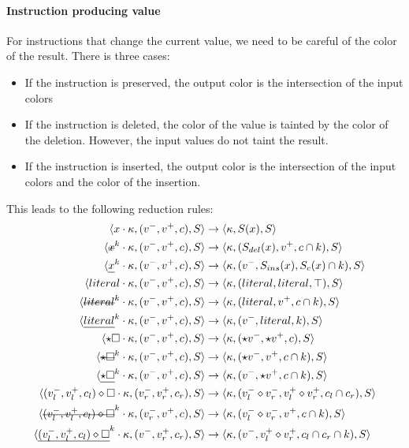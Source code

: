 \documentclass[a4paper,11pt]{article}
\newcommand\mathst[1]{\text{\st{$#1$}}}
\newcommand\mathul[1]{\text{\ul{$#1$}}}
\newcommand\rtstate[3]{\langle #1, #2, #3\rangle}
\begin{document}
\paragraph{Instruction producing value}
For instructions that change the current value, we need to be careful of the color of the result. There is three cases:
\begin{itemize}
  \item If the instruction is preserved, the output color is the intersection of the input colors
  \item If the instruction is deleted, the color of the value is tainted by the color of the deletion. However, the input values do not taint the result.
  \item If the instruction is inserted, the output color is the intersection of the input colors and the color of the insertion.
\end{itemize}

This leads to the following reduction rules:
\begin{align*}
\rtstate{x \cdot \kappa}{(v^-, v^+, c)}{S} &\rightarrow \rtstate{\kappa}{S(x)}{S}\\
\rtstate{\mathst{x}^k \cdot \kappa}{(v^-, v^+, c)}{S} &\rightarrow \rtstate{\kappa}{(S_{del}(x), v^+, c \cap k)}{S}\\
\rtstate{\mathul{x}^k \cdot \kappa}{(v^-, v^+, c)}{S} &\rightarrow \rtstate{\kappa}{(v^-, S_{ins}(x), S_c(x) \cap k)}{S}\\
\rtstate{literal \cdot \kappa}{(v^-, v^+, c)}{S} &\rightarrow \rtstate{\kappa}{(literal, literal, \top)}{S}\\
\rtstate{\mathst{literal}^k \cdot \kappa}{(v^-, v^+, c)}{S} &\rightarrow \rtstate{\kappa}{(literal, v^+, c \cap k)}{S}\\
\rtstate{\mathul{literal}^k \cdot \kappa}{(v^-, v^+, c)}{S} &\rightarrow \rtstate{\kappa}{(v^-, literal, k)}{S}\\
\rtstate{\star \square \cdot \kappa}{(v^-, v^+, c)}{S} &\rightarrow \rtstate{\kappa}{(\star v^-, \star v^+, c)}{S}\\
\rtstate{\mathst{\star \square}^k \cdot \kappa}{(v^-, v^+, c)}{S} &\rightarrow \rtstate{\kappa}{(\star v^-, v^+, c \cap k)}{S}\\
\rtstate{\mathul{\star \square}^k \cdot \kappa}{(v^-, v^+, c)}{S} &\rightarrow \rtstate{\kappa}{(v^-, \star v^+, c \cap k)}{S}\\
\rtstate{(v_l^-, v_l^+, c_l) \diamond \square \cdot \kappa}{(v_r^-, v_r^+, c_r)}{S} &\rightarrow \rtstate{\kappa}{(v_l^- \diamond v_r^-, v_l^+ \diamond v_r^+, c_l \cap c_r)}{S}\\
\rtstate{\mathst{(v_l^-, v_l^+, c_l) \diamond \square}^k \cdot \kappa}{(v_r^-, v^+, c)}{S} &\rightarrow \rtstate{\kappa}{(v_l^- \diamond v_r^-, v^+, c \cap k)}{S}\\
\rtstate{\mathul{(v_l^-, v_l^+, c_l) \diamond \square}^k \cdot \kappa}{(v^-, v_r^+, c_r)}{S} &\rightarrow \rtstate{\kappa}{(v^-, v_l^+ \diamond v_r^+, c_l \cap c_r \cap k)}{S}\\
\end{align*}
\end{document}
